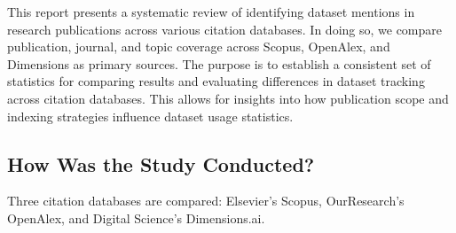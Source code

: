 \documentclass[
  letterpaper,
  DIV=11,
  numbers=noendperiod]{scrartcl}
\begin{document}
This report presents a systematic review of identifying dataset mentions
in research publications across various citation databases. In doing so,
we compare publication, journal, and topic coverage across Scopus,
OpenAlex, and Dimensions as primary sources. The purpose is to establish
a consistent set of statistics for comparing results and evaluating
differences in dataset tracking across citation databases. This allows
for insights into how publication scope and indexing strategies
influence dataset usage statistics.

\subsection*{How Was the Study
Conducted?}\label{how-was-the-study-conducted}

Three citation databases are compared: Elsevier's Scopus, OurResearch's
OpenAlex, and Digital Science's Dimensions.ai.
\end{document}
